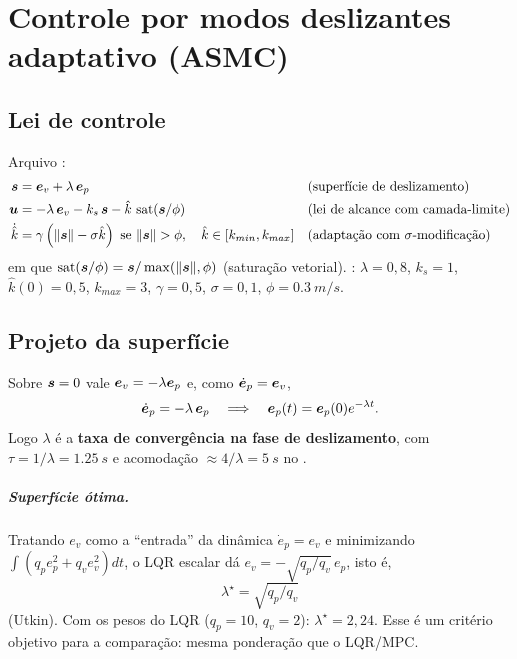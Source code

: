 \chapter{Controle por modos deslizantes adaptativo (ASMC)}
\label{cap:smc}

\section{Lei de controle}
Arquivo :
\begin{align}
  \bm{s} &= \bm{e}_v + \lambda\,\bm{e}_p && \text{(superfície de deslizamento)}\\
  \bm{u} &= -\lambda\,\bm{e}_v - k_s\,\bm{s} - \hat k\,\operatorname{sat}(\bm{s}/\phi)
            && \text{(lei de alcance com camada-limite)}\\
  \dot{\hat k} &= \gamma\left(\lVert\bm{s}\rVert - \sigma\hat k\right)\ \text{se } \lVert\bm{s}\rVert>\phi,
  \quad \hat k\in[k_{min},k_{max}] && \text{(adaptação com $\sigma$-modificação)}
\end{align}
em que $\operatorname{sat}(\bm{s}/\phi) = \bm{s}/\max(\lVert\bm{s}\rVert,\phi)$ (saturação vetorial).
: $\lambda=0{,}8$, $k_s=1$, $\hat k(0)=0{,}5$, $k_{max}=3$, $\gamma=0{,}5$,
$\sigma=0{,}1$, $\phi=\SI{0,3}{m/s}$.

\section{Projeto da superfície}
Sobre $\bm{s}=0$ vale $\bm{e}_v=-\lambda\bm{e}_p$ e, como $\dot{\bm{e}}_p=\bm{e}_v$,
\begin{equation}
  \dot{\bm{e}}_p = -\lambda\,\bm{e}_p \quad\Longrightarrow\quad \bm{e}_p(t)=\bm{e}_p(0)e^{-\lambda t}.
\end{equation}
Logo $\lambda$ é a \textbf{taxa de convergência na fase de deslizamento}, com
$\tau=1/\lambda=\SI{1,25}{s}$ e acomodação $\approx 4/\lambda=\SI{5}{s}$ no .

\paragraph{Superfície ótima.} Tratando $e_v$ como a ``entrada'' da dinâmica
$\dot e_p=e_v$ e minimizando $\int(q_p e_p^2 + q_v e_v^2)dt$, o LQR escalar dá
$e_v=-\sqrt{q_p/q_v}\,e_p$, isto é,
\begin{equation}
  \boxed{\lambda^\star = \sqrt{q_p/q_v}}
\end{equation}
(Utkin). Com os pesos do LQR ($q_p=10$, $q_v=2$): $\lambda^\star=2{,}24$. Esse é um
critério objetivo para a comparação: mesma ponderação que o LQR/MPC.

